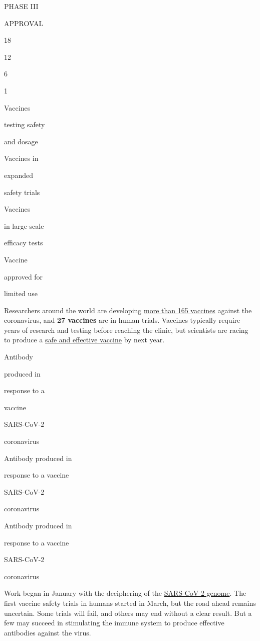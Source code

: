 PHASE III

APPROVAL

18

12

6

1

Vaccines

testing safety

and dosage

Vaccines in

expanded

safety trials

Vaccines

in large-scale

efficacy tests

Vaccine

approved for

limited use

Researchers around the world are developing
\href{https://www.who.int/publications/m/item/draft-landscape-of-covid-19-candidate-vaccines}{more
than 165 vaccines} against the coronavirus, and \textbf{27 vaccines} are
in human trials. Vaccines typically require years of research and
testing before reaching the clinic, but scientists are racing to produce
a
\href{https://www.nytimes3xbfgragh.onion/interactive/2020/05/20/science/coronavirus-vaccine-development.html}{safe
and effective vaccine} by next year.

Antibody

produced in

response to a

vaccine

SARS-CoV-2

coronavirus

Antibody produced in

response to a vaccine

SARS-CoV-2

coronavirus

Antibody produced in

response to a vaccine

SARS-CoV-2

coronavirus

Work began in January with the deciphering of the
\href{https://www.nytimes3xbfgragh.onion/interactive/2020/04/03/science/coronavirus-genome-bad-news-wrapped-in-protein.html}{SARS-CoV-2
genome}. The first vaccine safety trials in humans started in March, but
the road ahead remains uncertain. Some trials will fail, and others may
end without a clear result. But a few may succeed in stimulating the
immune system to produce effective antibodies against the virus.

